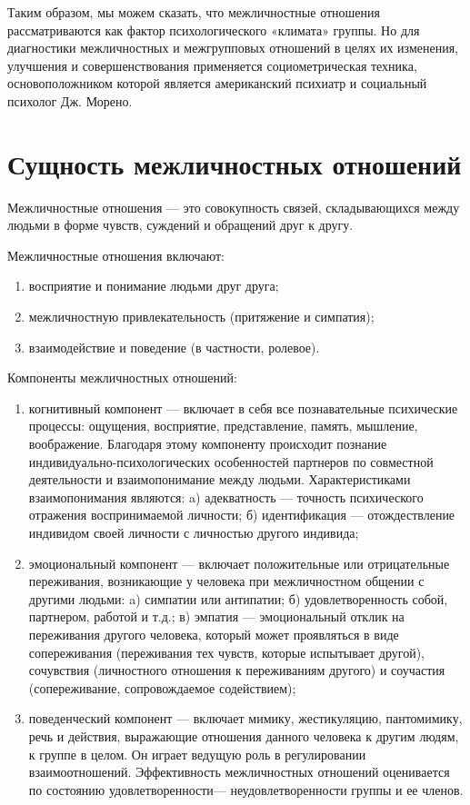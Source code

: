 Таким образом, мы можем сказать, что межличностные отношения рассматриваются как фактор психологического «климата» группы. Но для диагностики межличностных и межгрупповых отношений в целях их изменения, улучшения и совершенствования применяется социометрическая техника, основоположником которой является американский психиатр и социальный психолог Дж. Морено. 

\section{Сущность межличностных отношений}
Межличностные отношения — это совокупность связей, складывающихся между людьми в форме чувств, суждений и обращений друг к другу. \cite{28}

Межличностные отношения включают:
\begin{enumerate}
	\item восприятие и понимание людьми друг друга;
	\item межличностную привлекательность (притяжение и симпатия);
	\item взаимодействие и поведение (в частности, ролевое).
\end{enumerate}

Компоненты межличностных отношений:

\begin{enumerate}
	\item когнитивный компонент — включает в себя все познавательные психические процессы: ощущения, восприятие, представление, память, мышление, воображение. Благодаря этому компоненту происходит познание индивидуально-психологических особенностей партнеров по совместной деятельности и взаимопонимание между людьми. Характеристиками взаимопонимания являются:
		\subitem a) адекватность — точность психического отражения воспринимаемой личности;
		\subitem б) идентификация — отождествление индивидом своей личности с личностью другого индивида;
	\item эмоциональный компонент — включает положительные или отрицательные переживания, возникающие у человека при межличностном общении с другими людьми:
		\subitem a) симпатии или антипатии;
		\subitem б) удовлетворенность собой, партнером, работой и т.д.;
		\subitem в) эмпатия — эмоциональный отклик на переживания другого человека, который может проявляться в виде сопереживания (переживания тех чувств, которые испытывает другой), сочувствия (личностного отношения к переживаниям другого) и соучастия (сопереживание, сопровождаемое содействием);
	\item поведенческий компонент — включает мимику, жестикуляцию, пантомимику, речь и действия, выражающие отношения данного человека к другим людям, к группе в целом. Он играет ведущую роль в регулировании взаимоотношений. Эффективность межличностных отношений оценивается по состоянию удовлетворенности— неудовлетворенности группы и ее членов.
\end{enumerate}

